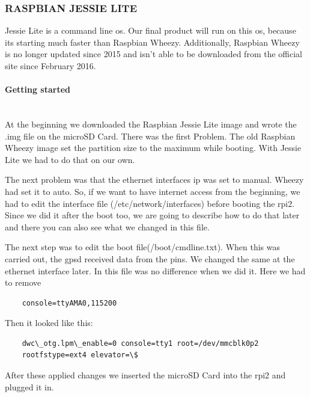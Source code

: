 \subsubsection{RASPBIAN JESSIE LITE}
Jessie Lite is a command line \gls{os}. Our final product will run on this \gls{os}, because its starting much faster than Raspbian Wheezy. Additionally, Raspbian Wheezy is no longer  updated since 2015 and isn't able to be downloaded from the official site since February 2016.
\paragraph{Getting started} \mbox{}\\
At the beginning we downloaded the Raspbian Jessie Lite image and wrote the .img file on the microSD Card. There was the first Problem. The old Raspbian Wheezy image set the partition size to the maximum while booting. With Jessie Lite we had to do that on our own. 

The next problem was that the ethernet interfaces \gls{ip} was set to manual. Wheezy had set it to auto. So, if we want to have internet access from the beginning, we had to edit the interface file (/etc/network/interfaces) before booting the \gls{rpi2}. Since we did it after the boot too, we are going to describe how to do that later and there you can also see what we changed in this file.

The next step was to edit the boot file(/boot/cmdline.txt). When this was carried out, the \gls{gpsd} received data from the pins. We changed the same at the ethernet interface later. In this file was no difference when we did it. 
\newline \newline
Here we had to remove 
\begin{verbatim}
	console=ttyAMA0,115200
\end{verbatim}
Then it looked like this: 
\begin{verbatim}
	dwc\_otg.lpm\_enable=0 console=tty1 root=/dev/mmcblk0p2 
	rootfstype=ext4 elevator=\$ 
\end{verbatim}
After these applied changes we inserted the microSD Card into the \gls{rpi2} and plugged it in.
